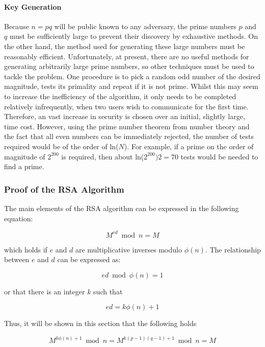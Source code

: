 \documentclass[a4paper,12pt]{report}
\begin{document}
\paragraph{Key Generation}

Because $n=pq$ will be public known to any adversary, the prime numbers $p$ and $q$ must be sufficiently large to prevent their discovery by exhaustive methods. On the other hand, the method used for generating these large numbers must be reasonably efficient. Unfortunately, at present, there are no useful methods for generating arbitrarily large prime numbers, so other techniques must be used to tackle the problem. One procedure is to pick a random odd number of the desired magnitude, tests its primality and repeat if it is not prime. Whilst this may seem to increase the inefficiency of the algorithm, it only needs to be completed relatively infrequently, when two users wish to communicate for the first time. Therefore, an vast increase in security is chosen over an initial, slightly large, time cost. However, using the prime number theorem from number theory\footnotemark\label{fnm:1} and the fact that all even numbers can be immediately rejected, the number of tests required would be of the order of ln($N$). For example, if a prime on the order of magnitude of $2^{200}$ is required, then about ln($2^{200})$\textfractionsolidus $2 = 70$ tests would be needed to find a prime. 

\subsubsection{Proof of the RSA Algorithm}

The main elements of the RSA algorithm can be expressed in the following equation:

\[ M^{ed} \bmod n = M \]

which holds if $e$ and $d$ are multiplicative inverses modulo $\phi(n)$. The relationship between $e$ and $d$ can be expressed as:

\[ ed \bmod \phi(n) = 1 \]

or that there is an integer $k$ such that

\[ ed = k\phi(n) + 1 \]

Thus, it will be shown in this section that the following holds

\begin{equation}
 M^{k\phi(n) + 1} \bmod n = M^{k(p-1)(q-1) + 1} \bmod n = M
\label{eq:proof}
\end{equation}
\end{document}
